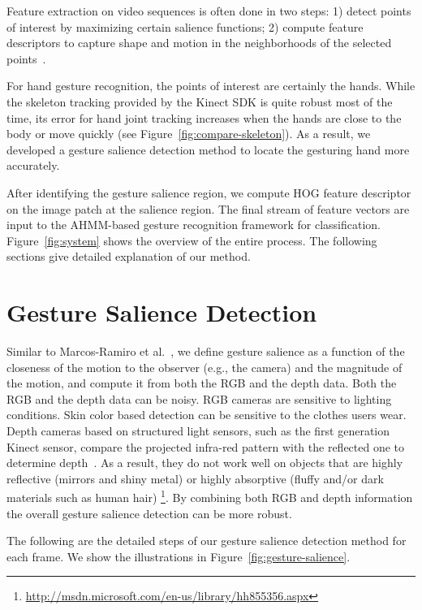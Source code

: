 \documentclass{sigchi}
\begin{document}
Feature extraction on video sequences is often done in two steps: 1)
detect points of interest by maximizing certain salience functions; 2) compute
feature descriptors to capture shape and motion in the neighborhoods of the selected
points~\cite{wang-spatio-2009}.

For hand gesture recognition, the points of interest are certainly the hands. While the skeleton tracking provided
by the Kinect SDK is quite robust most of the time, its error for hand joint tracking increases when
the hands are close to the body or move quickly (see Figure~\ref{fig:compare-skeleton}). As a result, we
developed a gesture salience detection method to locate the gesturing hand more accurately.

After identifying the gesture salience region, we compute HOG feature descriptor 
on the image patch at the salience region. The final stream of feature vectors are input to the AHMM-based
gesture recognition framework for classification. Figure~\ref{fig:system} shows the overview of the entire process.
The following sections give detailed explanation of our method.  
 
\section{Gesture Salience Detection}

Similar to Marcos-Ramiro et al.~\cite{marcos2013}, we define gesture salience as a function of 
the closeness of the motion to the observer (e.g., the camera) and the magnitude of the motion,
and compute it from both the RGB and the depth data. Both the RGB and the depth data can be noisy. RGB cameras are sensitive to lighting conditions.
Skin color based detection can be sensitive to the clothes users wear. Depth cameras based on 
structured light sensors, such as the first generation Kinect sensor, compare the projected infra-red pattern
with the reflected one to determine depth~\cite{welsh:2011}. As a result, they do not work well on 
objects that are highly reflective (mirrors and shiny metal) or highly absorptive (fluffy and/or dark materials such as human hair)
\footnote{\url{http://msdn.microsoft.com/en-us/library/hh855356.aspx}}. By combining both RGB and
depth information
the overall gesture salience detection can be more robust.

The following are the detailed steps of our gesture salience detection method for each frame. 
We show the illustrations in Figure~\ref{fig:gesture-salience}. 
\end{document}

